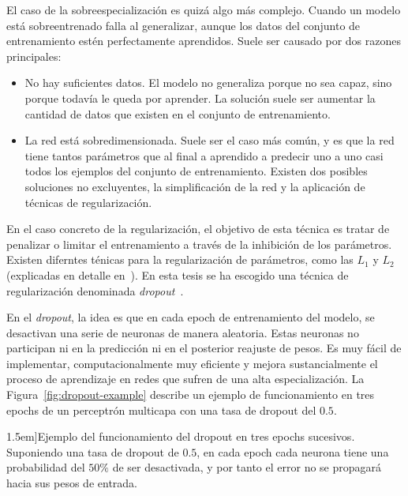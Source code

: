 El caso de la sobreespecialización es quizá algo más complejo. Cuando un modelo está sobreentrenado falla al generalizar, aunque los datos del conjunto de entrenamiento estén perfectamente aprendidos. Suele ser causado por dos razones principales:

\begin{itemize}
	\item No hay suficientes datos. El modelo no generaliza porque no sea capaz, sino porque todavía le queda por aprender. La solución suele ser aumentar la cantidad de datos que existen en el conjunto de entrenamiento.
	\item La red está sobredimensionada. Suele ser el caso más común, y es que la red tiene tantos parámetros que al final a aprendido a predecir uno a uno casi todos los ejemplos del conjunto de entrenamiento. Existen dos posibles soluciones no excluyentes, la simplificación de la red y la aplicación de técnicas de regularización.
\end{itemize}

En el caso concreto de la regularización, el objetivo de esta técnica es tratar de penalizar o limitar el entrenamiento a través de la inhibición de los parámetros. Existen diferntes ténicas para la regularización de parámetros, como las $L_1$ y $L_2$ (explicadas en detalle en~\cite{ng2004feature}). En esta tesis se ha escogido una técnica de regularización denominada \textit{dropout}~\cite{srivastava2014dropout}.

En el \textit{dropout}, la idea es que en cada epoch de entrenamiento del modelo, se desactivan una serie de neuronas de manera aleatoria. Estas neuronas no participan ni en la predicción ni en el posterior reajuste de pesos. Es muy fácil de implementar, computacionalmente muy eficiente y mejora sustancialmente el proceso de aprendizaje en redes que sufren de una alta especialización. La Figura~\ref{fig:dropout-example} describe un ejemplo de funcionamiento en tres epochs de un perceptrón multicapa con una tasa de dropout del $0.5$.

\begin{figure*}
	\centering
	\qquad
	\qquad
	\caption[Ejemplo de la operación de dropout para tres epochs sucesivos][1.5em]{Ejemplo del funcionamiento del dropout en tres epochs sucesivos. Suponiendo una tasa de dropout de $0.5$, en cada epoch cada neurona tiene una probabilidad del $50\%$ de ser desactivada, y por tanto el error no se propagará hacia sus pesos de entrada.}
	\label{fig:dropout-example}
\end{figure*}

